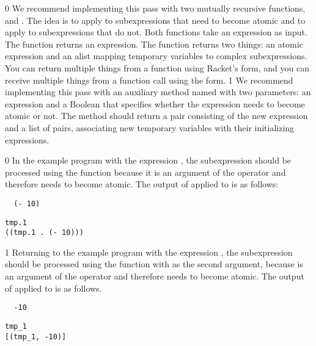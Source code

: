 \documentclass[7x10]{TimesAPriori_MIT}%
\def\racketEd{0}
\def\pythonEd{1}
\def\edition{1}
\newcommand{\pythonColor}[0]{}
\numberwithin{theorem}{chapter}
\numberwithin{definition}{chapter}
\numberwithin{equation}{chapter}
\begin{document}
{\if\edition\racketEd
We recommend implementing this pass with two mutually recursive
functions,  and . The idea is to apply
 to subexpressions that need to become atomic and to
apply  to subexpressions that do not.  Both functions
take an \LangVar{} expression as input.  The  function
returns an expression.  The  function returns two
things: an atomic expression and an alist mapping temporary variables to
complex subexpressions. You can return multiple things from a function
using Racket's  form, and you can receive multiple things
from a function call using the  form.
\fi}
%
{\if\edition\pythonEd\pythonColor
%
We recommend implementing this pass with an auxiliary method named
 with two parameters: an \LangVar{} expression and a
Boolean that specifies whether the expression needs to become atomic
or not.  The  method should return a pair consisting of
the new expression and a list of pairs, associating new temporary
variables with their initializing expressions.
%
\fi}

{\if\edition\racketEd
%
In the example program with the expression , the subexpression  should be processed using the
 function because it is an argument of the \code{+}
operator and therefore needs to become atomic.  The output of
 applied to  is as follows:
\begin{transformation}
\begin{lstlisting}
  (- 10)
\end{lstlisting}
\compilesto
\begin{lstlisting}
tmp.1
((tmp.1 . (- 10)))
\end{lstlisting}
\end{transformation}
\fi}
%
{\if\edition\pythonEd\pythonColor
%
Returning to the example program with the expression ,
the subexpression  should be processed using the
 function with  as the second argument,
because  is an argument of the \code{+} operator and
therefore needs to become atomic.  The output of 
applied to  is as follows.
\begin{transformation}
\begin{lstlisting}
  -10
\end{lstlisting}
\compilesto
\begin{lstlisting}
tmp_1
[(tmp_1, -10)]
\end{lstlisting}
\end{transformation}
%  
\fi}
\end{document}

